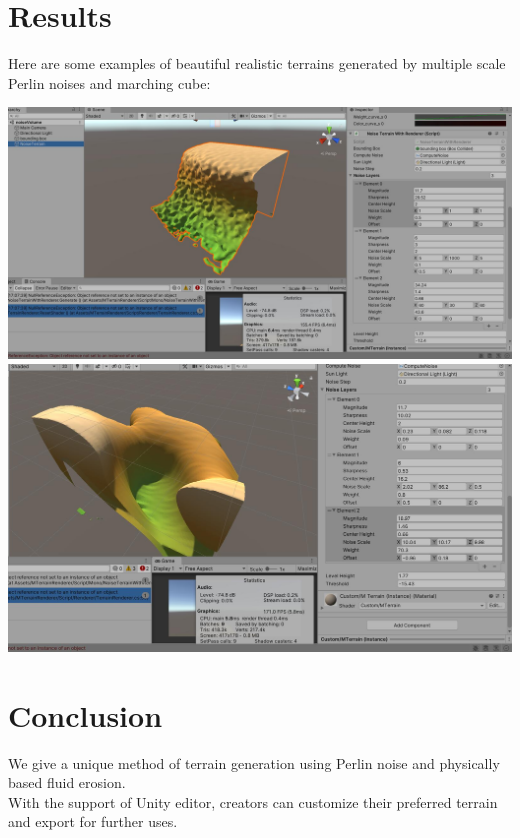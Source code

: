 \documentclass[acmtog]{acmart}
\begin{document}
\section{Results}
Here are some examples of beautiful realistic terrains generated by multiple scale Perlin noises and marching cube:
\begin{center}
    \includegraphics[width=0.9\linewidth]{../Images/Terrain_0.jpg}
    \includegraphics[width=0.9\linewidth]{../Images/Terrain_1.jpg}
\end{center}

\section{Conclusion}
We give a unique method of terrain generation using Perlin noise and physically based fluid erosion.\\
With the support of Unity editor, creators can customize their preferred terrain and export for further uses.
\end{document}
